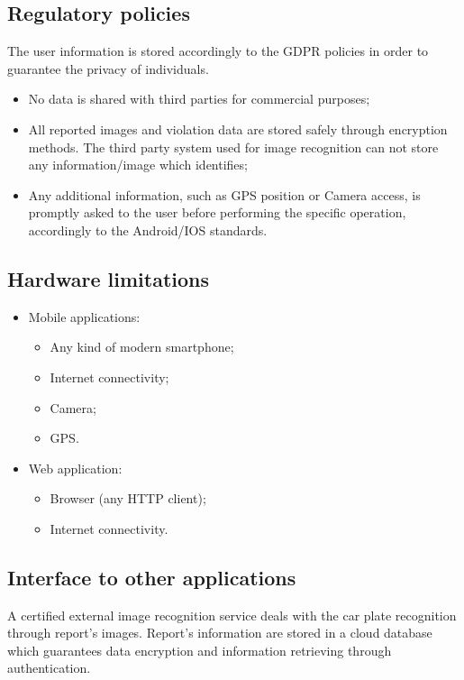 \subsection{Regulatory policies}
The user information is stored accordingly to the GDPR policies in order to guarantee the privacy of individuals.
\begin{itemize}
    \item No data is shared with third parties for commercial purposes;
    \item All reported images and violation data are stored safely through encryption methods. The third party system used for image recognition can not store any information/image which identifies;
    \item Any additional information, such as GPS position or Camera access, is promptly asked to the user before performing the specific operation, accordingly to the Android/IOS standards.
\end{itemize}


\subsection{Hardware limitations}
\begin{itemize}
    \item Mobile applications:
    \begin{itemize}
        \item Any kind of modern smartphone;
        \item Internet connectivity;
        \item Camera;
        \item GPS.
    \end{itemize}
    \item Web application:
    \begin{itemize}
        \item Browser (any HTTP client);
        \item Internet connectivity.
    \end{itemize}
\end{itemize}
\subsection{Interface to other applications}
A certified external image recognition service deals with the car plate recognition through report's images.\newline
Report's information are stored in a cloud database which guarantees data encryption and information retrieving through authentication.